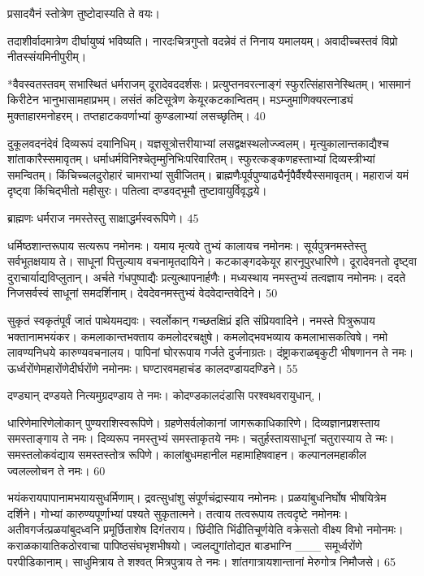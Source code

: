   प्रसादयैनं स्तोत्रेण तुष्टोदास्यति ते वयः।

तदाशीर्वादमात्रेण दीर्घायुष्यं भविष्यति।
 नारदःचित्रगुप्तो वदन्नेवं तं निनाय यमालयम्।
 अवादीच्चस्तवं विप्रो नीतस्संयमिनीपुरीम्।
 
*वैवस्वतस्तवम् सभास्थितं धर्मराजम् दूरादेवददर्शसः।
 प्रत्युप्तनवरत्नाङ्गं स्फुरत्सिंहासनेस्थितम्।
 भासमानं किरीटेन भानुभासामहाप्रभम्।
 लसंतं कटिसूत्रेण केयूरकटकान्वितम्।
 मऽम्जुमाणिक्यरत्नाड्यं मुक्ताहारमनोहरम्।
 तप्तहाटकवर्णाभ्यां कुण्डलाभ्यां लसच्छृतिम्।
 40

  दुकूलवदनंदेवं दिव्यरूपं दयानिधिम्।
 यज्ञसूत्रोत्तरीयाभ्यां लसद्वक्षस्थलोज्ज्वलम्।
 मृत्युकालान्तकाद्यैश्च शांताकारैस्समावृतम्।
 धर्माधर्मविनिश्चेतृम्मुनिभिःपरिवारितम्।
 स्फुरत्कङ्कणहस्ताभ्यां दिव्यस्त्रीभ्यां समन्वितम्।
 किंचिच्चलदुरोहारं चामराभ्यां सुवीजितम्।
 ब्राह्मणैःपूर्वपुण्याढ्यैर्नृपैर्वैश्यैस्समावृतम्।
 महाराजं यमं दृष्ट्वा किंचिद्भीतो महीसुरः।
 पतित्वा दण्डवद्भूमौ तुष्टावायुर्विवृद्धये।
 
ब्राह्मणः
धर्मराज नमस्तेस्तु साक्षाद्धर्मस्वरूपिणे।
45


धर्मिष्ठशान्तरूपाय सत्यरूप नमोनमः।
 यमाय मृत्यवे तुभ्यं कालायच नमोनमः।
 सूर्यपुत्रनमस्तेस्तु सर्वभूतक्षयाय ते।
 साधूनां पित्तुल्याय वचनामृतदायिने।
 कटकाङ्गदकेयूर हारनूपुरधारिणे।
 दूरादेवनतो दृष्ट्वा दुराचार्याद्यविप्लुतान्।
 अर्चते गंधपुष्पाद्यैः प्रत्युत्थापनार्हणैः।
 मध्यस्थाय नमस्तुभ्यं तत्वज्ञाय नमोनमः।
 ददते निजसर्वस्वं साधूनां समदर्शिनाम्।
 देवदेवनमस्तुभ्यं वेदवेदान्तवेदिने।
 50

  सुकृतं स्वकृतंपूर्वं जातं पाथेयमद्यवः।
 स्वर्लोकान् गच्छतक्षिप्रं इति संप्रियवादिने।
 नमस्ते पित्रुरूपाय भक्तानामभयंकर।
 कमलाकान्तभक्ताय कमलोदरचक्षुषे।
 कमलोद्भवभव्याय कमलाभासकत्विषे।
 नमो लावण्यनिधये कारुण्यवचनालय।
 पापिनां घोररूपाय गर्जते दुर्जनाग्रतः।
 दंष्ट्राकराळबृकुटी भीषणानन ते नमः।
 ऊर्ध्वरोंणेमहारोंणेदीर्घरोंणे नमोनमः।
 घण्टारवमहाचंड कालदण्डायदण्डिने।
 55

  दण्ड्यान् दण्डयते नित्यमुग्रदण्डाय ते नमः।
 कोदण्डकालदंडासि परश्वथवरायुधान्,।
 
धारिणेमारिणेलोकान् पुण्यराशिस्वरूपिणे।
 ग्रहणेसर्वलोकानां जागरूकाधिकारिणे।
 दिव्यज्ञानप्रशस्ताय समस्ताङ्गाय ते नमः।
 दिव्यरूप नमस्तुभ्यं समस्ताकृतये नमः।
 चतुर्हस्तायसाधूनां चतुरास्याय ते न्मः।
 समस्तलोकवंद्याय समस्तस्तोत्र रूपिणे।
 कालांबुधमहानील महामाहिषवाहन।
 कल्पानलमहाकील ज्वलल्लोचन ते नमः।
 60

  भयंकरायपापानामभयायसुधर्मिणाम्।
 द्रवत्सुधांशु संपूर्णचंद्रास्याय नमोनमः।
 प्रळयांबुधनिर्घोष भीषयित्रेम दर्शिने।
 गोभ्यां कारुण्यपूर्णाभ्यां पश्यते सुकृतात्मने।
 तत्वाय तत्वरूपाय तत्वदृष्टे नमोनमः।
 अतीवगर्जत्प्रळयांबुदध्वनि
प्रमूर्छिताशेष दिगंतराय।
 छिंदीति भिंढीतिचूर्णयेति वक्रेसतो
वीक्ष्य विभो नमोनमः।
 कराळकायातिकठोरवाचा पापिष्ठसंघभृशभीषयो।
 ज्वलद्युगांतोद्यत बाडभाग्नि
___ समूर्ध्वरोंणे परपीडिकानाम्।
 साधुमित्राय ते शश्वत् मित्रपुत्राय ते नमः।
 शांतगात्रायशान्तानां मेरुगोत्र निमौजसे।
 65

